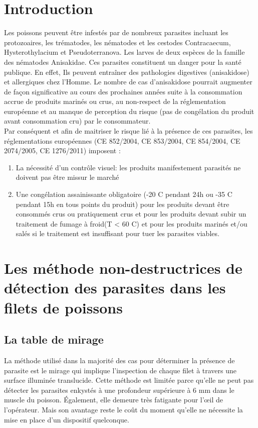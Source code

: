 \documentclass[12pt,a4paper]{article}
\begin{document}
\section*{Introduction}
 Les poissons peuvent être infestés par de nombreux parasites incluant les protozoaires, les trématodes, les nématodes et les cestodes Contracaecum, Hysterothylacium
et Pseudoterranova. Les larves de deux espèces de la famille des nématodes Anisakidae. Ces parasites constituent un danger pour la santé publique. En effet,  Ils peuvent entraîner des
pathologies digestives (anisakidose) et allergiques chez
l’Homme. Le nombre de cas d’anisakidose pourrait
augmenter de façon significative au cours des prochaines
années suite à la consommation accrue de produits marinés
ou crus, au non-respect de la réglementation européenne
et au manque de perception du risque (pas de congélation
du produit avant consommation cru) par le consommateur.\\
 Par conséquent et afin de maitriser le risque lié à la présence de ces parasites,
les réglementations européennes (CE 852/2004, CE 853/2004,
CE 854/2004, CE 2074/2005, CE 1276/2011) imposent :
\begin{enumerate}
\item La nécessité d’un contrôle visuel: les produits manifestement parasités ne doivent
pas être missur le marché
 \item Une congélation assainissante obligatoire
(-20 \degree C pendant 24h ou -35 \degree C pendant 15h en tous points du produit)
pour les produits devant être consommés crus ou pratiquement crus
et pour les produits devant subir un traitement de fumage à froid(T < 60 \degree C) et pour les produits marinés et/ou salés si le traitement est insuffisant pour tuer les parasites viables.
\end{enumerate}

\newpage

\section {Les  méthode  non-destructrices de détection des parasites dans les filets de poissons}
\subsection{La table de mirage}
La méthode utilisé dans la majorité des cas pour déterminer la présence de parasite est le mirage qui implique l’inspection de chaque filet à travers une surface illuminée translucide. Cette méthode est limitée parce qu’elle ne peut pas détecter les parasites enkystés à une profondeur supérieure à 6 mm dans le muscle du poisson. Également, elle demeure très fatigante pour l'œil de l'opérateur. Mais son avantage reste le coût du moment qu'elle ne nécessite la mise en place d'un dispositif quelconque.
\end{document}
